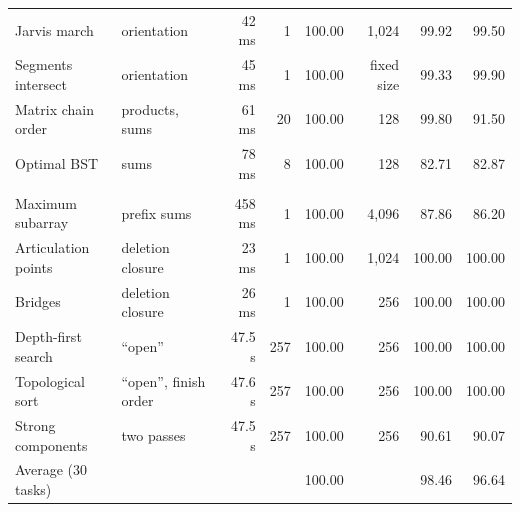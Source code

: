 \begin{tabular}{llrrrrrr}
Jarvis march & orientation & 42 ms & 1 & 100.00 & 1,024 & 99.92 & 99.50 \\
Segments intersect & orientation & 45 ms & 1 & 100.00 & fixed size & 99.33 & 99.90 \\
Matrix chain order & products, sums & 61 ms & 20 & 100.00 & 128 & 99.80 & 91.50 \\
Optimal BST & sums & 78 ms & 8 & 100.00 & 128 & 82.71 & 82.87 \\
\addlinespace[2pt]
\multicolumn{8}{l}{\textit{Algorithmic structure supplied}} \\
Maximum subarray & prefix sums & 458 ms & 1 & 100.00 & 4,096 & 87.86 & 86.20 \\
Articulation points & deletion closure & 23 ms & 1 & 100.00 & 1,024 & 100.00 & 100.00 \\
Bridges & deletion closure & 26 ms & 1 & 100.00 & 256 & 100.00 & 100.00 \\
Depth-first search & ``open'' & 47.5 s & 257 & 100.00 & 256 & 100.00 & 100.00 \\
Topological sort & ``open'', finish order & 47.6 s & 257 & 100.00 & 256 & 100.00 & 100.00 \\
Strong components & two passes & 47.5 s & 257 & 100.00 & 256 & 90.61 & 90.07 \\
\midrule
Average (30 tasks) & & & & 100.00 & & 98.46 & 96.64 \\
\bottomrule\end{tabular}
